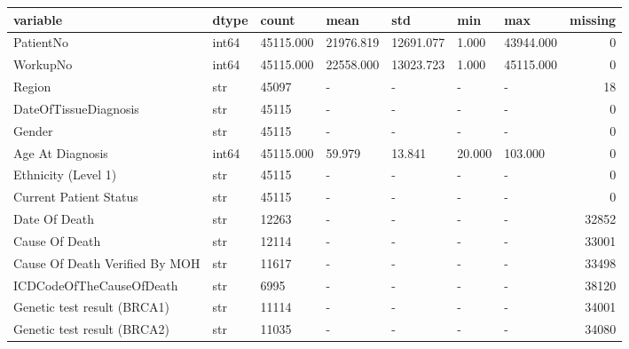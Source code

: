 \begin{tabular}{lllllllr}
\toprule
variable & dtype & count & mean & std & min & max & missing \\
\midrule
PatientNo & int64 & 45115.000 & 21976.819 & 12691.077 & 1.000 & 43944.000 & 0 \\
WorkupNo & int64 & 45115.000 & 22558.000 & 13023.723 & 1.000 & 45115.000 & 0 \\
Region & str & 45097 & - & - & - & - & 18 \\
DateOfTissueDiagnosis & str & 45115 & - & - & - & - & 0 \\
Gender & str & 45115 & - & - & - & - & 0 \\
Age At Diagnosis & int64 & 45115.000 & 59.979 & 13.841 & 20.000 & 103.000 & 0 \\
Ethnicity (Level 1) & str & 45115 & - & - & - & - & 0 \\
Current Patient Status & str & 45115 & - & - & - & - & 0 \\
Date Of Death & str & 12263 & - & - & - & - & 32852 \\
Cause Of Death & str & 12114 & - & - & - & - & 33001 \\
Cause Of Death Verified By MOH & str & 11617 & - & - & - & - & 33498 \\
ICDCodeOfTheCauseOfDeath & str & 6995 & - & - & - & - & 38120 \\
Genetic test result (BRCA1) & str & 11114 & - & - & - & - & 34001 \\
Genetic test result (BRCA2) & str & 11035 & - & - & - & - & 34080 \\
\bottomrule
\end{tabular}
